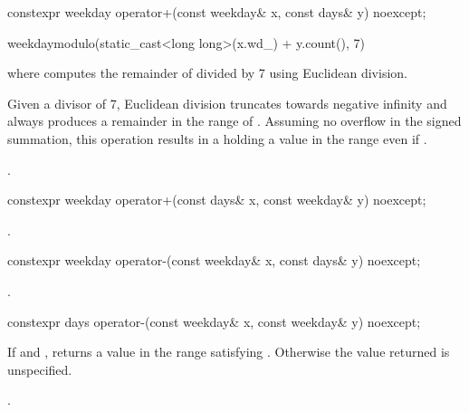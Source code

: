 %
\begin{itemdecl}
constexpr weekday operator+(const weekday& x, const days& y) noexcept;
\end{itemdecl}

\begin{itemdescr}
\pnum
\returns
\begin{codeblock}
weekday{modulo(static_cast<long long>(x.wd_) + y.count(), 7)}
\end{codeblock}
where  computes the remainder of  divided by 7 using Euclidean division.
\begin{note}
Given a divisor of 7, Euclidean division truncates towards negative infinity and
always produces a remainder in the range of .
Assuming no overflow in the signed summation,
this operation results in a  holding a value in the range  even if .
\end{note}
\begin{example}
.
\end{example}
\end{itemdescr}

%
\begin{itemdecl}
constexpr weekday operator+(const days& x, const weekday& y) noexcept;
\end{itemdecl}

\begin{itemdescr}
\pnum
\returns
{}.
\end{itemdescr}

%
\begin{itemdecl}
constexpr weekday operator-(const weekday& x, const days& y) noexcept;
\end{itemdecl}

\begin{itemdescr}
\pnum
\returns
{}.
\end{itemdescr}

%
\begin{itemdecl}
constexpr days operator-(const weekday& x, const weekday& y) noexcept;
\end{itemdecl}

\begin{itemdescr}
\pnum
\returns
If 
and ,
returns a value 
in the range 
satisfying .
Otherwise the value returned is unspecified.
\begin{example}
.
\end{example}
\end{itemdescr}

